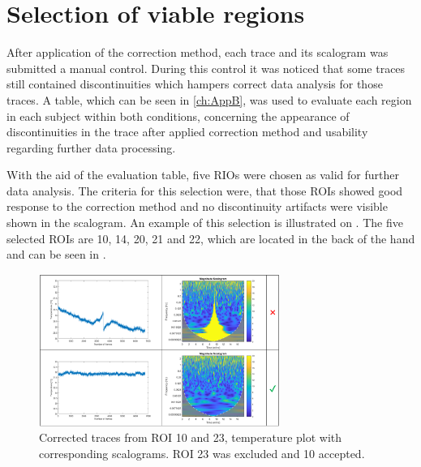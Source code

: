 \section{Selection of viable regions}

After application of the correction method, each trace and its scalogram was submitted a manual control. During this control it was noticed that some traces still contained discontinuities which hampers correct data analysis for those traces. A table, which can be seen in \ref{ch:AppB}, was used to evaluate each region in each subject within both conditions, concerning the appearance of discontinuities in the trace after applied correction method and usability regarding further data processing.

With the aid of the evaluation table, five RIOs were chosen as valid for further data analysis. The criteria for this selection were, that those ROIs showed good response to the correction method and no discontinuity artifacts were visible shown in the scalogram. An example of this selection is illustrated on . The five selected ROIs are 10, 14, 20, 21 and 22, which are located in the back of the hand and can be seen in .

\begin{figure}[H]
	\includegraphics[width=0.7\textwidth]{figures/ROI_selection}
	\caption{Corrected traces from ROI 10 and 23, temperature plot with corresponding scalograms. ROI 23 was excluded and 10 accepted.}
	\label{fig:selection}
\end{figure} 